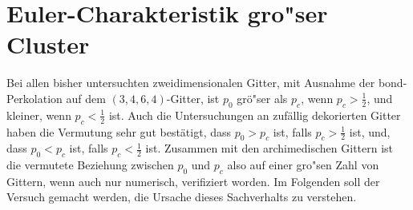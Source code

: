 \section{Euler-Charakteristik gro"ser Cluster}
\label{sec:scaling}
Bei allen bisher untersuchten zweidimensionalen Gitter, mit Ausnahme der bond-Perkolation auf dem $(3,4,6,4)$-Gitter, ist $p_0$ gr\"o"ser als $p_c$, wenn $p_c>\frac{1}{2}$, und kleiner, wenn $p_c<\frac{1}{2}$ ist. Auch die Untersuchungen an zuf\"allig dekorierten Gitter haben die Vermutung sehr gut best\"atigt, dass $p_0>p_c$ ist, falls $p_c>\frac{1}{2}$ ist, und, dass $p_0<p_c$ ist, falls $p_c<\frac{1}{2}$ ist. Zusammen mit den archimedischen Gittern ist die vermutete Beziehung zwischen $p_0$ und $p_c$ also auf einer gro"sen Zahl von Gittern, wenn auch nur numerisch, verifiziert worden. Im Folgenden soll der Versuch gemacht werden, die Ursache dieses Sachverhalts zu verstehen.\\

